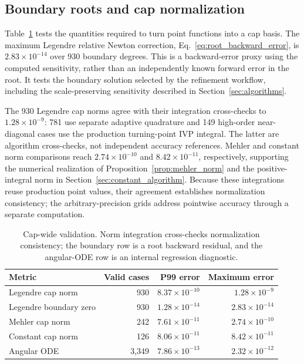 ﻿\documentclass[11pt,a4paper]{article}
\begin{document}
\subsection{Boundary roots and cap normalization}

Table~\ref{tab:global_results} tests the quantities required to turn point functions into a cap basis. The maximum Legendre relative Newton correction, Eq.~\eqref{eq:root_backward_error}, is $2.83\times10^{-14}$ over 930 boundary degrees. This is a backward-error proxy using the computed sensitivity, rather than an independently known forward error in the root. It tests the boundary solution selected by the refinement workflow, including the scale-preserving sensitivity described in Section~\ref{sec:algorithms}.

The 930 Legendre cap norms agree with their integration cross-checks to $1.28\times10^{-9}$: 781 use separate adaptive quadrature and 149 high-order near-diagonal cases use the production turning-point IVP integral. The latter are algorithm cross-checks, not independent accuracy references. Mehler and constant norm comparisons reach $2.74\times10^{-10}$ and $8.42\times10^{-11}$, respectively, supporting the numerical realization of Proposition~\ref{prop:mehler_norm} and the positive-integral norm in Section~\ref{sec:constant_algorithm}. Because these integrations reuse production point values, their agreement establishes normalization consistency; the arbitrary-precision grids address pointwise accuracy through a separate computation.

\begin{table}[!htbp]
\centering
\small
\caption{Cap-wide validation. Norm integration cross-checks normalization consistency; the boundary row is a root backward residual, and the angular-ODE row is an internal regression diagnostic.}
\label{tab:global_results}
\begin{tabular}{lrrr}
\toprule
Metric & Valid cases & P99 error & Maximum error\\
\midrule
Legendre cap norm & 930 & $8.37\times10^{-10}$ & $1.28\times10^{-9}$\\
Legendre boundary zero & 930 & $1.28\times10^{-14}$ & $2.83\times10^{-14}$\\
Mehler cap norm & 242 & $7.61\times10^{-11}$ & $2.74\times10^{-10}$\\
Constant cap norm & 126 & $8.06\times10^{-11}$ & $8.42\times10^{-11}$\\
Angular ODE & 3,349 & $7.86\times10^{-13}$ & $2.32\times10^{-12}$\\
\bottomrule
\end{tabular}
\end{table}
\end{document}
